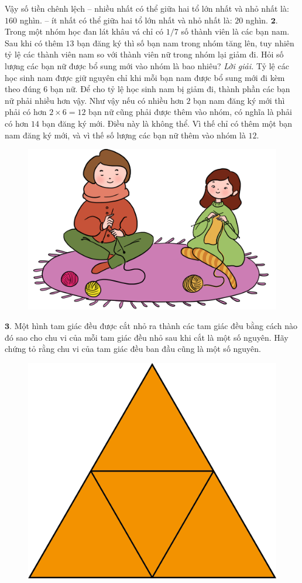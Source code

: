 \begin{multicols}{2}
	Vậy số tiền chênh lệch
	\vskip 0.1cm
	-- nhiều nhất có thể giữa hai tổ lớn nhất và nhỏ nhất là: $160$ nghìn.
	\vskip 0.1cm
	-- ít nhất có thể giữa hai tổ lớn nhất và nhỏ nhất là: $20$ nghìn.
	\vskip 0.1cm
	$\pmb{2.}$ Trong một nhóm học đan lát khâu vá chỉ có $1/7$ số thành viên là các bạn nam. Sau khi có thêm $13$ bạn đăng ký thì số bạn nam trong nhóm tăng lên, tuy nhiên tỷ lệ các thành viên nam so với thành viên nữ trong nhóm lại giảm đi. Hỏi số lượng các bạn nữ được bổ sung mới vào nhóm là bao nhiêu?
	\vskip 0.1cm
	\textit{Lời giải.} Tỷ lệ các học sinh nam được giữ nguyên chỉ khi mỗi bạn nam được bổ sung mới đi kèm theo đúng $6$ bạn nữ. Để cho tỷ lệ học sinh nam bị giảm đi, thành phần các bạn nữ phải nhiều hơn vậy. Như vậy nếu có nhiều hơn $2$ bạn nam đăng ký mới thì phải có hơn $2\times 6=12$ bạn nữ cũng phải được thêm vào nhóm, có nghĩa là phải có hơn $14$ bạn đăng ký mới. Điều này là không thể. Vì thế chỉ có thêm một bạn nam đăng ký mới, và vì thế số lượng các bạn nữ thêm vào nhóm là $12$. 
	\begin{figure}[H]
		\centering
		\vspace*{-10pt}
		\captionsetup{labelformat= empty, justification=centering}
		\includegraphics[width=0.8\linewidth]{Pi3_Bai2}
		\vspace*{-10pt}
	\end{figure}
	$\pmb{3.}$ Một hình tam giác đều được cắt nhỏ ra \linebreak thành các tam giác đều bằng cách nào đó sao cho chu vi của mỗi tam giác đều nhỏ sau khi cắt là một số nguyên. Hãy chứng tỏ rằng chu vi của tam giác đều ban đầu cũng là một số nguyên.
	\begin{figure}[H]
		\centering
		\vspace*{-10pt}
		\captionsetup{labelformat= empty, justification=centering}
		\includegraphics[width=0.4\linewidth]{Pi3_Bai3}

\end{figure}
\end{multicols}
